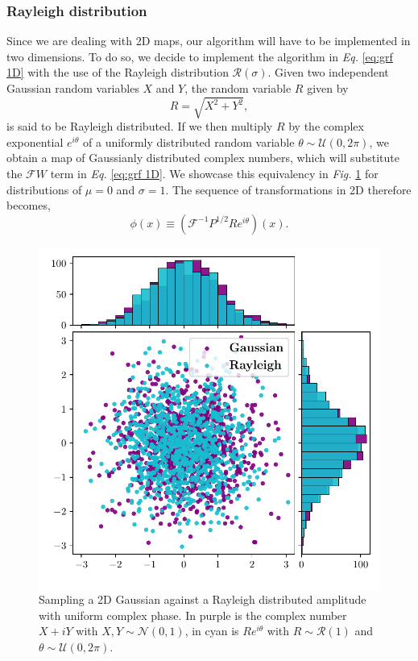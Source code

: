 \subsubsection{Rayleigh distribution}
Since we are dealing with 2D maps, our algorithm will have to be implemented in two dimensions. To do so, we decide to implement the algorithm in \textit{Eq. }\eqref{eq:grf 1D} with the use of the Rayleigh distribution $\mathcal{R}(\sigma)$. Given two independent Gaussian random variables $X$ and $Y$, the random variable $R$ given by
\begin{equation*}
    R=\sqrt{X^2+Y^2},
\end{equation*}
is said to be Rayleigh distributed. If we then multiply $R$ by the complex exponential $e^{i\theta}$ of a uniformly distributed random variable $\theta \sim \mathcal{U}(0,2\pi)$, we obtain a map of Gaussianly distributed complex numbers, which will substitute the $\mathcal{F}W$ term in \textit{Eq. }\eqref{eq:grf 1D}. We showcase this equivalency in \textit{Fig. }\ref{fig:rayleigh} for distributions of $\mu=0$ and $\sigma=1$. The sequence of transformations in 2D therefore becomes,
\begin{equation}
    \phi(x) \equiv (\mathcal{F}^{-1} P^{1/2} R e^{i\theta})(x).
    \label{eq:grf 2D}
\end{equation}

\begin{figure}[h]
    \centering
    \includegraphics[width=\textwidth]{images/7_rayleigh.pdf}
    \caption{\label{fig:rayleigh} Sampling a 2D Gaussian against a Rayleigh distributed amplitude with uniform complex phase. In purple is the complex number $X+iY$ with $X,Y \sim \mathcal{N}(0,1)$, in cyan is $Re^{i\theta}$ with $R\sim\mathcal{R}(1)$ and $\theta \sim \mathcal{U}(0,2\pi)$.}
\end{figure}

